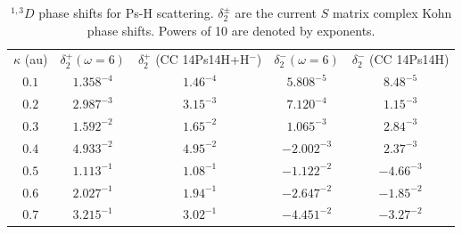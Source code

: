 \documentclass[preprint,showpacs,showkeys,preprintnumbers,amsmath,amssymb,longbibliography,pra,aps]{revtex4-1}
\begin{document}
\begin{table}
\begin{center}
\begin{ruledtabular}
\begin{tabular}{c c c c c}
$\kappa$ (au) & $\delta_2^+ (\omega = 6)$ & $\delta_2^+$ (CC 14Ps14H+H$^-$) \cite{Walters2004} & $\delta_2^- (\omega = 6)$ & $\delta_2^-$ (CC 14Ps14H) \cite{Blackwood2002} \\
\colrule
$0.1$ & $1.358^{-4}$ & $1.46^{-4}$ & $5.808^{-5}$ & $8.48^{-5}$ \\
$0.2$ & $2.987^{-3}$ & $3.15^{-3}$ & $7.120^{-4}$ & $1.15^{-3}$ \\
$0.3$ & $1.592^{-2}$ & $1.65^{-2}$ & $1.065^{-3}$ & $2.84^{-3}$ \\
$0.4$ & $4.933^{-2}$ & $4.95^{-2}$ & $-2.002^{-3}$ & $2.37^{-3}$ \\
$0.5$ & $1.113^{-1}$ & $1.08^{-1}$ & $-1.122^{-2}$ & $-4.66^{-3}$ \\
$0.6$ & $2.027^{-1}$ & $1.94^{-1}$ & $-2.647^{-2}$ & $-1.85^{-2}$ \\
$0.7$ & $3.215^{-1}$ & $3.02^{-1}$ & $-4.451^{-2}$ & $-3.27^{-2}$ \\
\end{tabular}
\end{ruledtabular}
\caption{$^{1,3}D$ phase shifts for Ps-H scattering. $\delta_2^\pm$ are the current
$S$ matrix complex Kohn phase shifts. Powers of 10 are denoted by exponents.}
\label{tab:DWavePhase}
\end{center}
\end{table}
\end{document}
